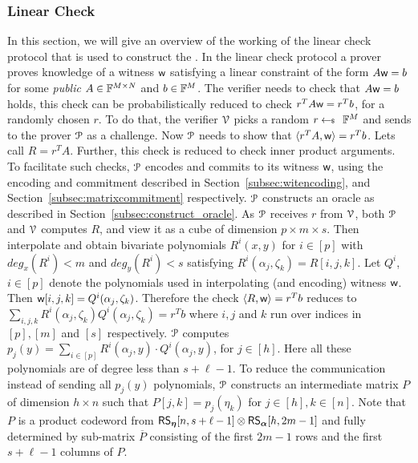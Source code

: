 \subsubsection{Linear Check}\label{subsec:lincheck}
In this section, we will give an overview of the working of the linear check protocol that is used to construct the \name. In the linear check protocol a prover proves knowledge of a witness $\wit$ satisfying a linear constraint of the form $A \wit = b$ for some \textit{public} $A \in \FF^{M \times N}$ and $b \in \FF^M$. 
The verifier needs to check that $A \wit = b$ holds, this check can be probabilistically reduced to check $r^T A \wit = r^T b$, for a randomly chosen $r$. To do that, the verifier $\verifier$ picks a random $r\sample \FF^M$ and sends to the prover $\prover$ as a challenge. Now $\prover$ needs to show that $\innp{r^T A}{\wit} = r^T b$. Lets call $R = r^T A$.
Further, this check is reduced to check inner product arguments. To facilitate such checks, $\prover$ encodes and commits to its witness $\wit$, using the encoding and commitment described in Section~\ref{subsec:witencoding}, and Section~\ref{subsec:matrixcommitment} respectively. $\prover$ constructs an oracle as described in Section~\ref{subsec:construct_oracle}.
As $\prover$ receives $r$ from $\verifier$, both $\prover$ and $\verifier$ computes $R$, and view it as a cube of dimension $p \times m \times s$. Then interpolate and obtain bivariate polynomials $R^i(x,y)$ for $i \in [p]$ with $deg_x(R^i) < m$ and $deg_y(R^i) < s$ satisfying $R^i(\alpha_j, \zeta_k) = R[i,j,k]$. Let $Q^i$, $i \in [p]$ denote the polynomials used in interpolating (and encoding) witness $\wit$. Then $\wit[i,j,k] = Q^i (\alpha_j, \zeta_k)$. Therefore the check $\innp{R}{\wit} = r^T b$ reduces to $\sum_{i,j,k}R^i(\alpha_j,\zeta_k)Q^i(\alpha_j,\zeta_k)=r^Tb$ where $i,j$ and $k$ run over indices in $[p],[m]$ and $[s]$ respectively. $\prover$ computes $p_j(y) = \sum_{i \in [p]} R^i(\alpha_j, y) \cdot Q^i(\alpha_j, y)$, for $j \in [h]$. Here all these polynomials are of degree less than $s+\ell-1$. To reduce the communication instead of sending all $p_j(y)$ polynomials, $\prover$ constructs an intermediate matrix $P$ of dimension $h \times n$ such that $P[j,k] = p_j(\eta_k)$ for $j\in[h], k\in[n]$. Note that $P$ is a product codeword from $\rsc{\eta}{n,s+\ell-1} \otimes \rsc{\alpha}{h,2m-1}$ and fully determined by sub-matrix $\overline{P}$ consisting of the first $2m-1$ rows and the first $s+\ell-1$ columns of $P$.

\smallskip  

